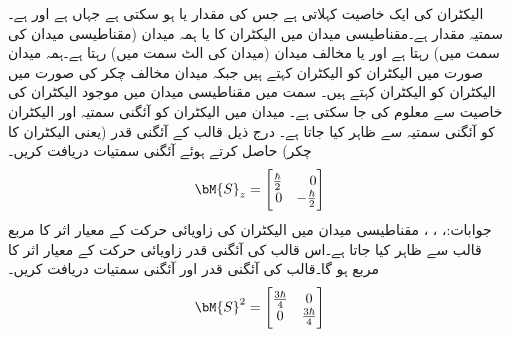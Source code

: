 الیکٹران کی ایک خاصیت   کہلاتی ہے جس کی مقدار   یا  ہو سکتی ہے  جہاں  ہے اور    ہے۔ سمتیہ مقدار ہے۔مقناطیسی میدان میں الیکٹران کا   یا ہمہ میدان (مقناطیسی میدان کی سمت میں) رہتا ہے اور یا مخالف میدان (میدان کی الٹ سمت میں) رہتا ہے۔ہمہ میدان صورت میں الیکٹران کو  الیکٹران کہتے ہیں جبکہ میدان مخالف چکر کی صورت میں  الیکٹران کو  الیکٹران کہتے ہیں۔ سمت میں مقناطیسی میدان میں موجود الیکٹران کی خاصیت   سے معلوم کی جا سکتی ہے۔ میدان میں  الیکٹران کو آئگنی سمتیہ  اور  الیکٹران کو آئگنی سمتیہ  سے ظاہر کیا جاتا ہے۔ درج ذیل  قالب کے آئگنی قدر (یعنی الیکٹران کا چکر) حاصل کرتے ہوئے آئگنی سمتیات دریافت کریں۔
 \begin{align*}
\bM{S}_z=\begin{bmatrix*}[r] \frac{\hbar}{2} & 0\\ 0 & -\frac{\hbar}{2}\end{bmatrix*}
\end{align*}
جوابات:، ، ،  
مقناطیسی میدان میں الیکٹران کی زاویائی حرکت کے معیار اثر کا مربع  قالب سے ظاہر کیا جاتا ہے۔اس قالب کی آئگنی قدر زاویائی حرکت کے معیار اثر کا مربع ہو گا۔قالب کی آئگنی قدر اور آئگنی سمتیات دریافت کریں۔
  \begin{align*}
\bM{S}^2=\begin{bmatrix*}\frac{3\hbar}{4} & 0\\ 0 & \frac{3\hbar}{4}\end{bmatrix*}
\end{align*}
